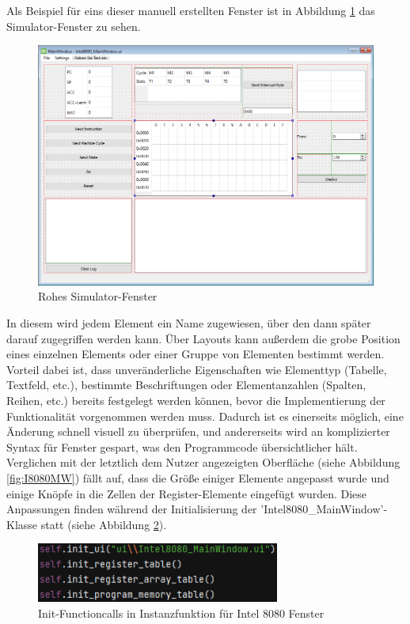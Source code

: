 \documentclass[12pt]{article}
\newcommand{\imgSpaceBefore}{\vspace{10pt}}
\begin{document}
\noindent
Als Beispiel für eins dieser manuell erstellten Fenster ist in Abbildung \ref{fig:RawUI} das Simulator-Fenster zu sehen.\imgSpaceBefore

\begin{figure}[H]
\centering
\includegraphics[width=15cm]{bilder/RawUIFile}
\caption{Rohes Simulator-Fenster}
\label{fig:RawUI}
\end{figure}

\noindent
In diesem wird jedem Element ein Name zugewiesen, über den dann später darauf zugegriffen werden kann. Über Layouts kann außerdem die grobe Position eines einzelnen Elements oder einer Gruppe von Elementen bestimmt werden. Vorteil dabei ist, dass unveränderliche Eigenschaften wie Elementtyp (Tabelle, Textfeld, etc.), bestimmte Beschriftungen oder Elementanzahlen (Spalten, Reihen, etc.) bereits festgelegt werden können, bevor die Implementierung der Funktionalität vorgenommen werden muss. Dadurch ist es einerseits möglich, eine Änderung schnell visuell zu überprüfen, und andererseits wird an komplizierter Syntax für Fenster gespart, was den Programmcode übersichtlicher hält. Verglichen mit der letztlich dem Nutzer angezeigten Oberfläche (siehe Abbildung \ref{fig:I8080MW}) fällt auf, dass die Größe einiger Elemente angepasst wurde und einige Knöpfe in die Zellen der Register-Elemente eingefügt wurden. Diese Anpassungen finden während der Initialisierung der 'Intel8080\_MainWindow'-Klasse statt (siehe Abbildung \ref{fig:InitFuncs}).\imgSpaceBefore

\begin{figure}[H]
\centering
\includegraphics[width=8cm]{bilder/initFuncs}
\caption{Init-Functioncalls in Instanzfunktion für Intel 8080 Fenster}
\label{fig:InitFuncs}
\end{figure}
\end{document}
